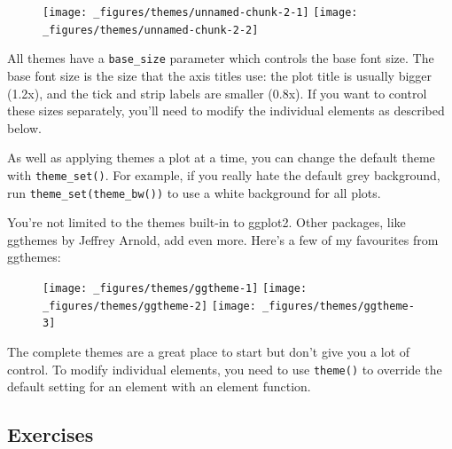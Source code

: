 \begin{figure}[H]
  \texttt{[image: \_figures/themes/unnamed-chunk-2-1]}%
  \texttt{[image: \_figures/themes/unnamed-chunk-2-2]}
\end{figure}

All themes have a \texttt{base\_size} parameter which controls the base
font size. The base font size is the size that the axis titles use: the
plot title is usually bigger (1.2x), and the tick and strip labels are
smaller (0.8x). If you want to control these sizes separately, you'll
need to modify the individual elements as described below.

As well as applying themes a plot at a time, you can change the default
theme with \texttt{theme\_set()}. For example, if you really hate the
default grey background, run \texttt{theme\_set(theme\_bw())} to use a
white background for all plots. 

You're not limited to the themes built-in to ggplot2. Other packages,
like ggthemes by Jeffrey Arnold, add even more. Here's a few of my
favourites from ggthemes: 

\begin{Shaded}
\begin{Highlighting}[]
\StringTok{ }\NormalTok{() +}\StringTok{ }\NormalTok{(}\NormalTok{)}
\StringTok{ }\NormalTok{() +}\StringTok{ }\NormalTok{(}\NormalTok{)}
\StringTok{ }\NormalTok{() +}\StringTok{ }\NormalTok{(}\NormalTok{) }\CommentTok{# ;)}
\end{Highlighting}
\end{Shaded}

\begin{figure}[H]
  \texttt{[image: \_figures/themes/ggtheme-1]}%
  \texttt{[image: \_figures/themes/ggtheme-2]}%
  \texttt{[image: \_figures/themes/ggtheme-3]}
\end{figure}

The complete themes are a great place to start but don't give you a lot
of control. To modify individual elements, you need to use
\texttt{theme()} to override the default setting for an element with an
element function.

\subsection{Exercises}\label{exercises}

